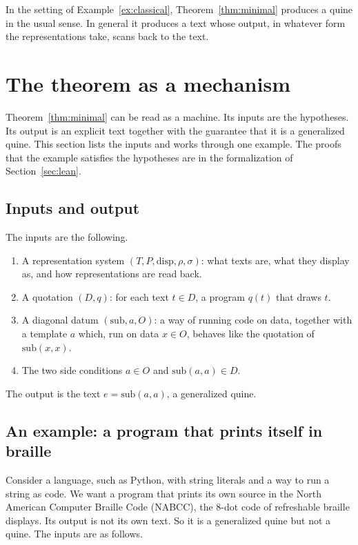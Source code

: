 \documentclass[11pt]{amsart}
\theoremstyle{definition}
\theoremstyle{remark}
\newcommand{\disp}{\mathrm{disp}}
\newcommand{\sub}{\mathrm{sub}}
\newcommand{\rend}{\rho}
\newcommand{\scan}{\sigma}
\begin{document}
In the setting of Example~\ref{ex:classical}, Theorem~\ref{thm:minimal} produces a quine in the
usual sense. In general it produces a text whose output, in whatever form the representations take,
scans back to the text.

\section{The theorem as a mechanism}\label{sec:mechanism}

Theorem~\ref{thm:minimal} can be read as a machine. Its inputs are the hypotheses. Its output is an
explicit text together with the guarantee that it is a generalized quine. This section lists the
inputs and works through one example. The proofs that the example satisfies the hypotheses are in
the formalization of Section~\ref{sec:lean}.

\subsection{Inputs and output}

The inputs are the following.
\begin{enumerate}[label=(I\arabic*)]
\item A representation system $(T, P, \disp, \rend, \scan)$: what texts are, what they display as,
and how representations are read back.
\item A quotation $(D, q)$: for each text $t \in D$, a program $q(t)$ that draws $t$.
\item A diagonal datum $(\sub, a, O)$: a way of running code on data, together with a template $a$
which, run
on data $x \in O$, behaves like the quotation of $\sub(x,x)$.
\item The two side conditions $a \in O$ and $\sub(a,a) \in D$.
\end{enumerate}
The output is the text $e = \sub(a,a)$, a generalized quine.

\subsection{An example: a program that prints itself in braille}\label{sec:braille-example}

Consider a language, such as Python, with string literals and a way to run a string as code. We
want a program that prints its own source in the North American Computer Braille Code (NABCC), the
8-dot code of refreshable braille displays. Its output is not its own text. So it is a generalized
quine but not a quine. The inputs are as follows.
\end{document}
